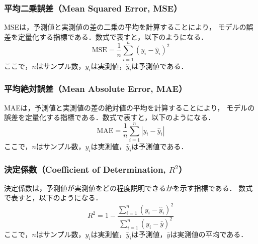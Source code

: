 \subsubsection*{平均二乗誤差（Mean Squared Error, MSE）}
MSEは，予測値と実測値の差の二乗の平均を計算することにより，
モデルの誤差を定量化する指標である．数式で表すと，以下のようになる．
\begin{equation}
  \label{eq:mse}
  \mathrm{MSE} = \frac{1}{n} \sum_{i=1}^{n} (y_i - \hat{y}_i)^2
\end{equation}
ここで，$n$はサンプル数，$y_i$は実測値，$\hat{y}_i$は予測値である．

\subsubsection*{平均絶対誤差（Mean Absolute Error, MAE）}
MAEは，予測値と実測値の差の絶対値の平均を計算することにより，
モデルの誤差を定量化する指標である．数式で表すと，以下のようになる．
\begin{equation}
  \label{eq:mae}
  \mathrm{MAE} = \frac{1}{n} \sum_{i=1}^{n} |y_i - \hat{y}_i|
\end{equation}
ここで，$n$はサンプル数，$y_i$は実測値，$\hat{y}_i$は予測値である．

\subsubsection*{決定係数（Coefficient of Determination, $R^2$）}
決定係数は，予測値が実測値をどの程度説明できるかを示す指標である．  
数式で表すと，以下のようになる．
\begin{equation}
  \label{eq:r2}
  R^2 = 1 - \frac{\sum_{i=1}^{n} (y_i - \hat{y}_i)^2}{\sum_{i=1}^{n} (y_i - \bar{y})^2}
\end{equation}
ここで，$n$はサンプル数，$y_i$は実測値，$\hat{y}_i$は予測値，$\bar{y}$は実測値の平均である．